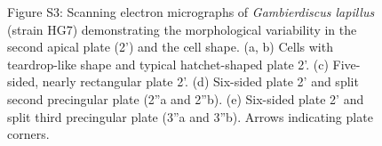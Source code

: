 \documentclass[12pt]{article}
\begin{document}
\FloatBarrier 
\begin{figure} 
\caption{Figure S3: Scanning electron micrographs of \textit{Gambierdiscus lapillus} (strain HG7) demonstrating the morphological variability in the second apical plate (2') and the cell shape. (a, b) Cells with teardrop-like shape and typical hatchet-shaped plate 2'. (c) Five-sided, nearly rectangular plate 2'. (d) Six-sided plate 2' and split second precingular plate (2''a and 2''b). (e) Six-sided plate 2' and split third precingular plate (3''a and 3''b). Arrows indicating plate corners.} 
\label{fig:s3SEM}
\end{figure} 
\FloatBarrier
\newpage


\end{document}
